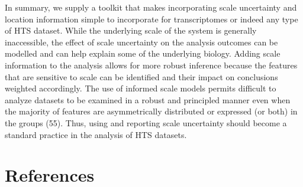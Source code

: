 \documentclass[
]{article}
\begin{document}
In summary, we supply a toolkit that makes incorporating scale
uncertainty and location information simple to incorporate for
transcriptomes or indeed any type of HTS dataset. While the underlying
scale of the system is generally inaccessible, the effect of scale
uncertainty on the analysis outcomes can be modelled and can help
explain some of the underlying biology. Adding scale information to the
analysis allows for more robust inference because the features that are
sensitive to scale can be identified and their impact on conclusions
weighted accordingly. The use of informed scale models permits difficult
to analyze datasets to be examined in a robust and principled manner
even when the majority of features are asymmetrically distributed or
expressed (or both) in the groups (55). Thus, using and reporting scale
uncertainty should become a standard practice in the analysis of HTS
datasets.

\singlespacing

\section*{References}\label{references}
\end{document}
